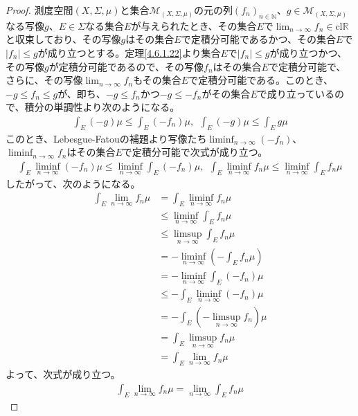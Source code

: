 \documentclass[dvipdfmx]{jsarticle}
\begin{document}
\begin{proof}
測度空間$(X,\varSigma,\mu)$と集合$\mathcal{M}_{(X,\varSigma,\mu)}$の元の列$\left( f_{n} \right)_{n \in \mathbb{N}}$、$g \in \mathcal{M}_{(X,\varSigma,\mu)}$なる写像$g$、$E \in \varSigma$なる集合$E$が与えられたとき、その集合$E$で$\lim_{n \rightarrow \infty}f_{n} \in \mathrm{cl}\mathbb{R}$と収束しており、その写像$g$はその集合$E$で定積分可能であるかつ、その集合$E$で$\left| f_{n} \right| \leq g$が成り立つとする。定理\ref{4.6.1.22}より集合$E$で$\left| f_{n} \right| \leq g$が成り立つかつ、その写像$g$が定積分可能であるので、その写像$f_{n}$はその集合$E$で定積分可能で、さらに、その写像$\lim_{n \rightarrow \infty}f_{n}$もその集合$E$で定積分可能である。このとき、$- g \leq f_{n} \leq g$が、即ち、$- g \leq f_{n}$かつ$- g \leq - f_{n}$がその集合$E$で成り立っているので、積分の単調性より次のようになる。
\begin{align*}
\int_{E} {( - g)\mu} \leq \int_{E} {\left( - f_{n} \right)\mu},\ \ \int_{E} {( - g)\mu} \leq \int_{E} {g\mu}
\end{align*}
このとき、Lebesgue-Fatouの補題より写像たち$\liminf_{n \rightarrow \infty}\left( - f_{n} \right)$、$\liminf_{n \rightarrow \infty}f_{n}$はその集合$E$で定積分可能で次式が成り立つ。
\begin{align*}
\int_{E} {\liminf_{n \rightarrow \infty}\left( - f_{n} \right)\mu} \leq \liminf_{n \rightarrow \infty}{\int_{E} {\left( - f_{n} \right)\mu}},\ \ \int_{E} {\liminf_{n \rightarrow \infty}f_{n}\mu} \leq \liminf_{n \rightarrow \infty}{\int_{E} {f_{n}\mu}}
\end{align*}
したがって、次のようになる。
\begin{align*}
\int_{E} {\lim_{n \rightarrow \infty}f_{n}\mu} &= \int_{E} {\liminf_{n \rightarrow \infty}f_{n}\mu}\\
&\leq \liminf_{n \rightarrow \infty}{\int_{E} {f_{n}\mu}}\\
&\leq \limsup_{n \rightarrow \infty}{\int_{E} {f_{n}\mu}}\\
&= - \liminf_{n \rightarrow \infty}\left( - \int_{E} {f_{n}\mu} \right)\\
&= - \liminf_{n \rightarrow \infty}{\int_{E} {\left( - f_{n} \right)\mu}}\\
&\leq - \int_{E} {\liminf_{n \rightarrow \infty}\left( - f_{n} \right)\mu}\\
&= - \int_{E} {\left( - \limsup_{n \rightarrow \infty}f_{n} \right)\mu}\\
&= \int_{E} {\limsup_{n \rightarrow \infty}f_{n}\mu}\\
&= \int_{E} {\lim_{n \rightarrow \infty}f_{n}\mu}
\end{align*}
よって、次式が成り立つ。
\begin{align*}
\int_{E} {\lim_{n \rightarrow \infty}f_{n}\mu} = \lim_{n \rightarrow \infty}{\int_{E} {f_{n}\mu}}
\end{align*}
\end{proof}
\end{document}
